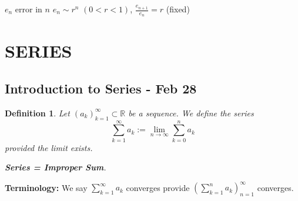 \documentclass[12pt]{article}
\theoremstyle{plain}
\newtheorem{definition}{Definition}[subsection]
\newcommand{\mR}{{\mathbb{R}}}
\begin{document}
$e_n$ error in $n$ $e_n \sim r^n$ $(0 < r < 1)$, $\frac{e_{n+1}}{e_n} = r$
(fixed) 



\newpage
\section{SERIES }
\subsection{Introduction to Series - Feb 28}
\begin{definition}
	Let $(a_k)_{k=1}^{\infty} \subset \mR$ be a sequence. We define the series
	\[
		\sum_{k=1}^{\infty} a_k := \lim_{n\to\infty} \sum_{k=0}^n a_k
	\]
	provided the limit exists. 

	\textbf{Series = Improper Sum}. 
\end{definition}

\textbf{Terminology:} We say $\sum_{k=1}^{\infty} a_k$ converges provide
$(\sum_{k=1}^n a_k)_{n=1}^{\infty}$ converges.\\
\end{document}
